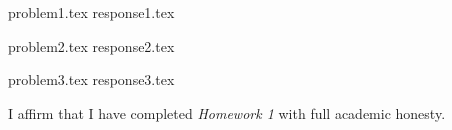 \documentclass[letterpaper, 12pt]{article}
\begin{document}

% 
{problem1.tex}
{response1.tex}

% 
{problem2.tex}
{response2.tex}

% 
{problem3.tex}
{response3.tex}

\par

I affirm that I have completed \textit{Homework 1} with full academic honesty.
\end{document}
